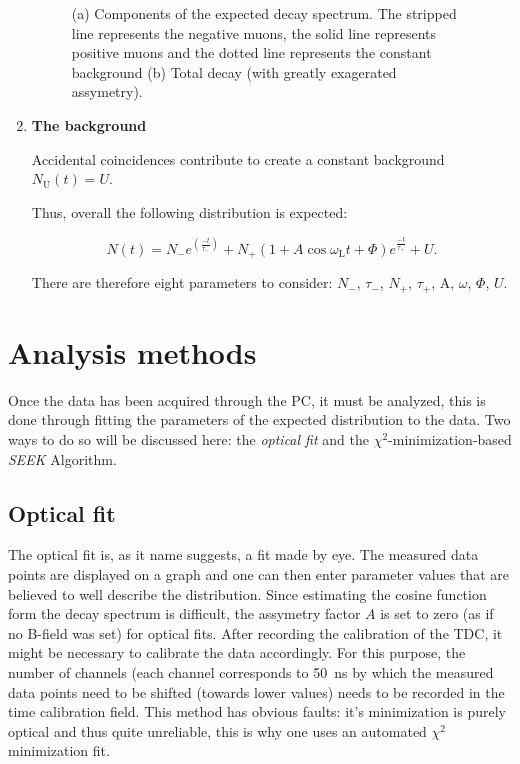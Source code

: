 \begin{enumerate}
\begin{figure}
\begin{subfigure}[t]{0.49\linewidth}
  \caption{}
\label{sfig:wigl2}
  \end{subfigure}
\caption{(a) Components of the expected decay spectrum. The stripped line represents the negative muons, the solid line represents positive muons and the dotted line represents the constant background (b) Total decay (with greatly exagerated assymetry).}
\label{fig:wigl}
\end{figure}

\item \textbf{The background}

Accidental coincidences contribute to create a constant background $N_{\text{U}}(t)=U$.

Thus, overall the following distribution is expected:

\begin{equation}
N(t)=N_{-}e^(\frac{-t}{\tau_{-}})+N_{+}(1+A\cos{\omega_{\text{L}}t+\Phi})e^{\frac{-t}{\tau_{+}}}+U.
\end{equation}

There are therefore eight parameters to consider: $N_{-}$, $\tau_{-}$, $N_{+}$, $\tau_{+}$, A, $\omega$, $\Phi$, $U$.

\end{enumerate}

\section{Analysis methods}

Once the data has been acquired through the PC, it must be analyzed, this is done through fitting the parameters of the expected distribution to the data. Two ways to do so will be discussed here: the \textit{optical fit} and the $\chi^2$-minimization-based \textit{SEEK} Algorithm.

\subsection{Optical fit}

The optical fit is, as it name suggests, a fit made by eye. The measured data points are displayed on a graph and one can then enter parameter values that are believed to well describe the distribution. Since estimating the cosine function form the \APmuon decay spectrum is difficult, the assymetry factor $A$ is set to zero (as if no B-field was set) for optical fits. After recording the calibration of the TDC, it might be necessary to calibrate the data accordingly. For this purpose, the number of channels (each channel corresponds to \SI{50}{\nano\second} by which the measured data points need to be shifted (towards lower values) needs to be recorded in the time calibration field. This method has obvious faults: it's minimization is purely optical and thus quite unreliable, this is why one uses an automated $\chi^2$ minimization fit.

